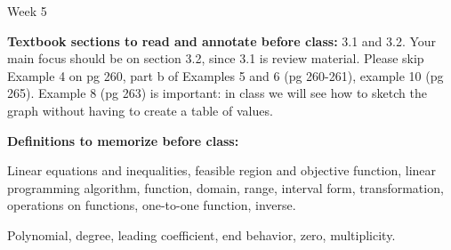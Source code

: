 \documentclass[12pt,dvipsnames]{article}
\begin{document}
\thispagestyle{empty}

	\begin{center}
		{\large{Week 5}}
	\end{center}

{\bfseries{Textbook sections to read and annotate before class:}}  3.1 and 3.2. Your main focus should be on section 3.2, since 3.1 is review material. Please skip Example 4 on pg 260, part b of Examples 5 and 6 (pg 260-261), example 10 (pg 265). Example 8 (pg 263) is important: in class we will see how to sketch the graph without having to create a table of values.
\smallskip

	{\bfseries{Definitions to memorize before class:}} 

\begin{description}[topsep=0pt,itemsep=-2ex,partopsep=0ex,parsep=1ex]
\item[From Weeks 1-4] Linear equations and inequalities, feasible region and objective function, linear programming algorithm,  function, domain, range, interval form, transformation, operations on functions, one-to-one function, inverse. 
\item[From Sections 3.1, 3.2] Polynomial, degree, leading coefficient, end behavior, zero, multiplicity.
\end{description}
\smallskip	
	
\end{document}
